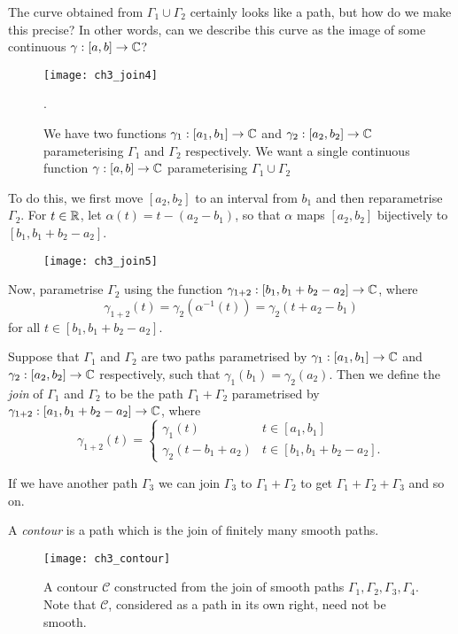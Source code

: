 The curve obtained from $\Gamma_1 \cup \Gamma_2 $ certainly looks like a path, but how do we make this precise?  In other words, can we describe this curve as the image of some continuous $\gamma: [a,b] \to \mathbb{C}$?
\begin{figure}[H]
\centering
\texttt{[image: ch3\_join4]}
\caption{We have two functions $\gamma_1:[a_1,b_1] \to \mathbb{C}$ and $\gamma_2:[a_2,b_2] \to \mathbb{C}$ parameterising $\Gamma_1$ and $\Gamma_2$ respectively.  We want a single continuous function $\gamma:[a,b] \to \mathbb{C}$ parameterising $\Gamma_1 \cup \Gamma_2$}.
\end{figure}
\begin{blankbox}
To do this, we first move $[a_2,b_2]$ to an interval from $b_1$ and then reparametrise $\Gamma_2$.  For $t \in \mathbb{R}$, let $\alpha(t)=  t-(a_2-b_1)$, so that $\alpha$ maps $[a_2,b_2]$ bijectively to $[b_1,b_1+b_2-a_2]$.
\begin{figure}[H]
\centering
\texttt{[image: ch3\_join5]}
\end{figure}
Now, parametrise $\Gamma_2$ using the function $\gamma_{1+2}:[b_1,b_1+b_2-a_2] \to \mathbb{C}$, where
\[
\gamma_{1+2} (t) = \gamma_2 ( \alpha^{-1} (t) ) = \gamma_2 (t+a_2-b_1)
\]
for all $t \in [b_1,b_1+b_2-a_2]$.
\end{blankbox}
\begin{definition}
Suppose that $\Gamma_1$ and $\Gamma_2$ are two paths parametrised by $\gamma_1:[a_1,b_1] \to \mathbb{C}$ and $\gamma_2:[a_2,b_2] \to \mathbb{C}$ respectively, such that $\gamma_1(b_1) = \gamma_2 (a_2)$.  Then we define the \emph{join} of $\Gamma_1$ and $\Gamma_2$ to be the path $\Gamma_1+\Gamma_2$ parametrised by $\gamma_{1+2}:[a_1,b_1+b_2-a_2] \to \mathbb{C}$, where
\[
\gamma_{1+2} (t) = \begin{cases}
\gamma_1 (t) & t \in [a_1,b_1] \\
\gamma_2 (t-b_1+a_2) & t \in [b_1,b_1+b_2-a_2].
\end{cases}
\]
\end{definition}


If we have another path $\Gamma_3$ we can join $\Gamma_3$ to $\Gamma_1+\Gamma_2$ to get $\Gamma_1+\Gamma_2+\Gamma_3$ and so on.

\begin{definition}
A \emph{contour} is a path which is the join of finitely many smooth paths.
\end{definition}

\begin{figure}[H]
\centering
\texttt{[image: ch3\_contour]}
\caption{A contour $\mathcal{C}$ constructed from the join of smooth paths $\Gamma_1,\Gamma_2,\Gamma_3,\Gamma_4$.  Note that $\mathcal{C}$, considered as a path in its own right, need not be smooth.}
\end{figure}


